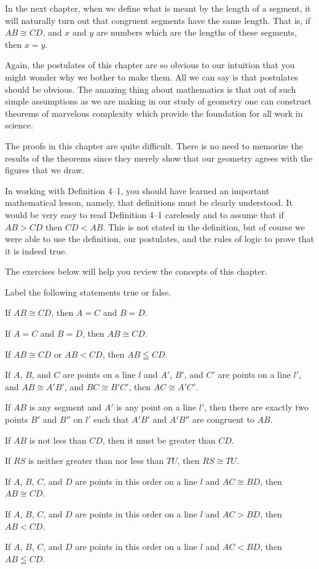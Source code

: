 \documentclass[11pt]{book}
\begin{document}
\begin{exercisecols}
In the next chapter, when we define what is meant by the length of a segment, it
will naturally turn out that congruent segments have the same length. That is, if
$AB \cong CD$, and $x$ and $y$ are numbers which are the lengths of these
segments, then $x = y$.

Again, the postulates of this chapter are so obvious to our intuition that you
might wonder why we bother to make them. All we can say is that postulates should
be obvious. The amazing thing about mathematics is that out of such simple
assumptions as we are making in our study of geometry one can construct theorems
of marvelous complexity which provide the foundation for all work in science.

The proofs in this chapter are quite difficult. There is no need to memorize the
results of the theorems since they merely show that our geometry agrees with the
figures that we draw.

In working with Definition 4--1, you should have learned an important
mathematical lesson, namely, that definitions must be clearly understood. It
would be very easy to read Definition 4--1 carelessly and to assume that if
$AB > CD$ then $CD < AB$. This is not stated in the definition, but of course we
were able to use the definition, our postulates, and the rules of logic to prove
that it is indeed true.

The exercises below will help you review the concepts of this chapter.

\medskip
Label the following statements true or false.

\begin{exlist}
\item If $AB \cong CD$, then $A = C$ and $B = D$.
\item If $A = C$ and $B = D$, then $AB \cong CD$.
\item If $AB \cong CD$ or $AB < CD$, then $AB \leqq CD$.
\item If $A$, $B$, and $C$ are points on a line $l$ and $A'$, $B'$, and $C'$ are
      points on a line $l'$, and $AB \cong A'B'$, and $BC \cong B'C'$, then
      $AC \cong A'C'$.
\item If $AB$ is any segment and $A'$ is any point on a line $l'$, then there are
      exactly two points $B'$ and $B''$ on $l'$ such that $A'B'$ and $A'B''$ are
      congruent to $AB$.
\item If $AB$ is not less than $CD$, then it must be greater than $CD$.
\item If $RS$ is neither greater than nor less than $TU$, then $RS \cong TU$.
\item If $A$, $B$, $C$, and $D$ are points in this order on a line $l$ and
      $AC \cong BD$, then $AB \cong CD$.
\item If $A$, $B$, $C$, and $D$ are points in this order on a line $l$ and
      $AC > BD$, then $AB < CD$.
\item If $A$, $B$, $C$, and $D$ are points in this order on a line $l$ and
      $AC < BD$, then $AB \leqq CD$.
\end{exlist}


\end{exercisecols}
\end{document}
